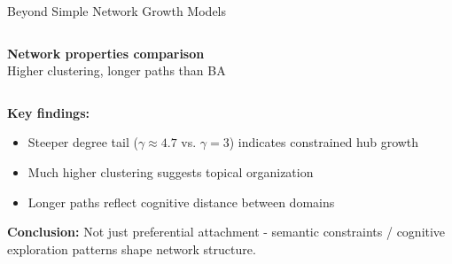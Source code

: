 \documentclass[nodes]{beamer}
\begin{document}
\begin{frame}{Beyond Simple Network Growth Models}
\begin{columns}[T]
\begin{column}{0.45\textwidth}
      \scriptsize \textbf{Network properties comparison}\\
      \scriptsize Higher clustering, longer paths than BA
    \end{column}
  \end{columns}
  \vspace{0.1cm}
  \scriptsize \textbf{Key findings:}
  \begin{itemize}
    \item \scriptsize Steeper degree tail ($\gamma \approx 4.7$ vs. $\gamma = 3$) indicates \alert{constrained hub growth}
    \item \scriptsize Much higher clustering suggests \alert{topical organization}
    \item \scriptsize Longer paths reflect \alert{cognitive distance} between domains
  \end{itemize}
  \small \textbf{Conclusion:} Not just preferential attachment - semantic constraints / cognitive exploration patterns shape network structure.
\end{frame}
\end{document}
